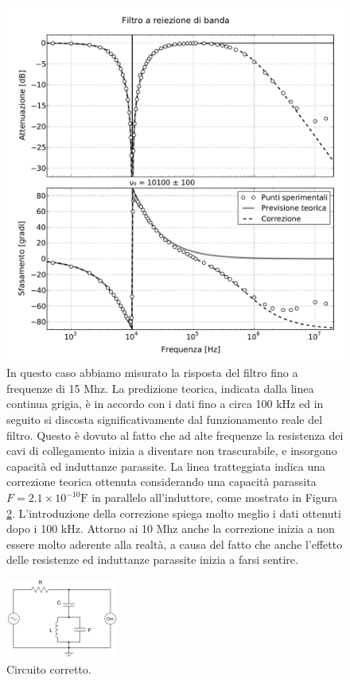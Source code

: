 \begin{figure}
  \includegraphics[scale=0.55]{notch.pdf}
  \caption{In questo caso abbiamo
    misurato la risposta del filtro fino a frequenze di 15 Mhz. La predizione teorica, indicata dalla linea
    continua grigia, è in accordo con i dati fino a circa 100 kHz ed in seguito si discosta significativamente
    dal funzionamento reale del filtro. Questo è dovuto al fatto che ad alte frequenze la resistenza dei cavi
    di collegamento inizia a diventare non trascurabile, e insorgono capacità ed induttanze parassite. La linea
    tratteggiata indica una correzione teorica ottenuta considerando una capacità parassita
    $F = 2.1 \times 10^{-10} \si{\farad}$ in parallelo all'induttore, come mostrato in Figura \ref{fig:corr}.
    L'introduzione della correzione spiega molto meglio i dati ottenuti dopo i 100 kHz. Attorno ai 10 Mhz anche la
    correzione inizia a non essere molto aderente alla realtà, a causa del fatto che anche l'effetto delle resistenze
    ed induttanze parassite inizia a farsi sentire.}
  \label{fig:g_notch}
\end{figure}

\begin{figure}
  \vspace{-1cm}
  \includegraphics[width=0.33\textwidth]{s_corr.pdf}
  \caption{Circuito corretto.}
  \label{fig:corr}
  \vspace{-1cm}
\end{figure}

